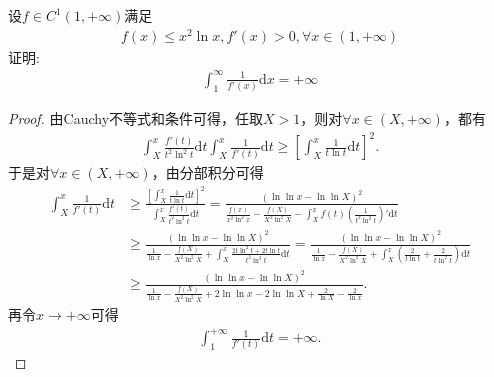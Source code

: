 \documentclass[../../main.tex]{subfiles}%
\begin{document}
\begin{example}
设$f\in C^1(1,+\infty)$满足
\begin{align*}
f(x)\leqslant x^2\ln x, f'(x)>0,\forall x\in(1,+\infty)
\end{align*}
证明:
\begin{align*}
\int_1^\infty \frac{1}{f'(x)}\mathrm{d}x=+\infty
\end{align*}
\end{example}
\begin{proof}
由Cauchy不等式和条件可得，任取$X>1$，则对$\forall x\in (X,+\infty)$，都有
\begin{align*}
\int_X^x \frac{f'(t)}{t^2\ln^2 t}\mathrm{d}t \int_X^x \frac{1}{f'(t)}\mathrm{d}t \geqslant \left[ \int_X^x \frac{1}{t\ln t}\mathrm{d}t \right]^2.
\end{align*}
于是对$\forall x\in (X,+\infty)$，由分部积分可得
\begin{align*}
\int_X^x \frac{1}{f'(t)}\mathrm{d}t &\geqslant \frac{\left[ \int_X^x \frac{1}{t\ln t}\mathrm{d}t \right]^2}{\int_X^x \frac{f'(t)}{t^2\ln^2 t}\mathrm{d}t} = \frac{\left( \ln\ln x - \ln\ln X \right)^2}{\frac{f(x)}{x^2\ln^2 x} - \frac{f(X)}{X^2\ln^2 X} - \int_X^x f(t) \left( \frac{1}{t^2\ln^2 t} \right)' \mathrm{d}t} \\
&\geqslant \frac{\left( \ln\ln x - \ln\ln X \right)^2}{\frac{1}{\ln x} - \frac{f(X)}{X^2\ln^2 X} + \int_X^x \frac{2t\ln^2 t + 2t\ln t}{t^2\ln^3 t}\mathrm{d}t} = \frac{\left( \ln\ln x - \ln\ln X \right)^2}{\frac{1}{\ln x} - \frac{f(X)}{X^2\ln^2 X} + \int_X^x \left( \frac{2}{t\ln t} + \frac{2}{t\ln^2 t} \right)\mathrm{d}t} \\
&\geqslant \frac{\left( \ln\ln x - \ln\ln X \right)^2}{\frac{1}{\ln x} - \frac{f(X)}{X^2\ln^2 X} + 2\ln\ln x - 2\ln\ln X + \frac{2}{\ln X} - \frac{2}{\ln x}}.
\end{align*}
再令$x\rightarrow +\infty$可得
\begin{align*}
\int_1^{+\infty} \frac{1}{f'(t)}\mathrm{d}t = +\infty.
\end{align*}
\end{proof}
\end{document}
